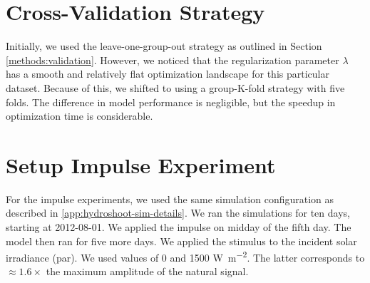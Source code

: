 

\section{Cross-Validation Strategy} \label{app:hydroshoot-validation}

Initially, we used the leave-one-group-out strategy as outlined in Section \ref{methods:validation}.
However, we noticed that the regularization parameter $\lambda$ has a smooth and relatively flat optimization landscape for this particular dataset. 
Because of this, we shifted to using a group-K-fold strategy with five folds.
The difference in model performance is negligible, but the speedup in optimization time is considerable.


\section{Setup Impulse Experiment} \label{app:hydroshoot-impulse}

For the impulse experiments, we used the same simulation configuration as described in \ref{app:hydroshoot-sim-details}.
We ran the simulations for ten days, starting at 2012-08-01.
We applied the impulse on midday of the fifth day. 
The model then ran for five more days.
We applied the stimulus to the incident solar irradiance (\acrshort{par}). We used values of 0 and 1500 \unit{\watt\per\meter\squared}. The latter corresponds to $\approx 1.6 \times$ the maximum amplitude of the natural signal.


